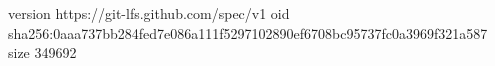 version https://git-lfs.github.com/spec/v1
oid sha256:0aaa737bb284fed7e086a111f5297102890ef6708bc95737fc0a3969f321a587
size 349692
